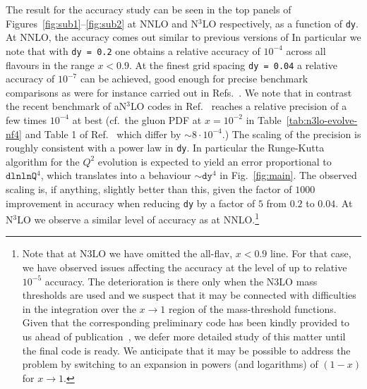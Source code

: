The result for the accuracy study can be seen in the top panels of
Figures~\ref{fig:sub1}--\ref{fig:sub2} at NNLO and N$^3$LO
respectively, as a function of \texttt{dy}.
%
At NNLO, the accuracy comes out similar to previous
versions of 
%
In particular we note that with \texttt{dy =
  0.2} one obtains a relative accuracy of $10^{-4}$ across all
flavours in the range $x < 0.9$.
%
At the finest grid spacing \texttt{dy = 0.04} a relative accuracy of
$10^{-7}$ can be achieved, good enough for precise benchmark
comparisons as were for instance carried out in
Refs.~\cite{Dittmar:2005ed,Bertone:2024dpm}. We note that in contrast
the recent benchmark of aN$^3$LO codes in
Ref.~\cite{Cooper-Sarkar:2024crx} reaches a relative precision of a
few times $10^{-4}$ at best (cf.\ the gluon PDF at $x = 10^{-2}$ in
Table~\ref{tab:n3lo-evolve-nf4} and Table 1 of
Ref.~\cite{Cooper-Sarkar:2024crx} which differ by $\sim 8\cdot 10^{-4}$.)
%
The scaling of the precision is roughly consistent with a power law in
\texttt{dy}.
%
In particular the Runge-Kutta algorithm for the $Q^2$ evolution is
expected to yield an error proportional to $\texttt{dlnlnQ}^4$, which
translates into a behaviour $\sim \texttt{dy}^4$ in
Fig.~\ref{fig:main}.
%
The observed scaling is, if anything, slightly better than this, given
the factor of $1000$ improvement in accuracy when reducing \texttt{dy}
by a factor of $5$ from $0.2$ to $0.04$.
%
At N$^3$LO we observe a similar level of accuracy as at
NNLO.\footnote{Note that at N3LO we have omitted the 
  all-flav, $x<0.9$ line.
  For that case, we have observed issues affecting the accuracy at the
  level of up to relative $10^{-5}$ accuracy.
  The deterioration is there only when the N3LO mass thresholds are
  used and we suspect that it may be connected with difficulties in the
  integration over the $x \to 1$ region of the mass-threshold
  functions.
  Given that the corresponding preliminary code has been kindly
  provided to us ahead of publication~\cite{BlumleinCode}, we defer
  more detailed study of this matter until the final code is ready.
  We anticipate that it may be possible to address the problem by
  switching to an expansion in powers (and logarithms) of $(1-x)$ for
  $x \to 1$.  }



